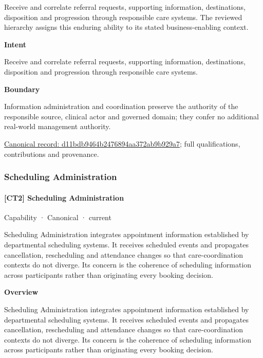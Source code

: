 Receive and correlate referral requests, supporting information, destinations, disposition and progression through responsible care systems. The reviewed hierarchy assigns this enduring ability to its stated business-enabling context.



\textbf{Intent}



Receive and correlate referral requests, supporting information, destinations, disposition and progression through responsible care systems.



\textbf{Boundary}



Information administration and coordination preserve the authority of the responsible source, clinical actor and governed domain; they confer no additional real-world management authority.


{\footnotesize \href{../../../../continuum/strategy/capability/d11bdb9464b2476894aa372ab9b929a7.md}{Canonical record: d11bdb9464b2476894aa372ab9b929a7}; full qualifications, contributions and provenance.}\par
\subsubsection{Scheduling Administration}

\paragraph{[CT2] Scheduling Administration}

\label{element:35fb3744c900470f9895056246a13fb1}
{\small Capability · Canonical · current}\par

Scheduling Administration integrates appointment information established by departmental scheduling systems. It receives scheduled events and propagates cancellation, rescheduling and attendance changes so that care-coordination contexts do not diverge. Its concern is the coherence of scheduling information across participants rather than originating every booking decision.



\textbf{Overview}



Scheduling Administration integrates appointment information established by departmental scheduling systems. It receives scheduled events and propagates cancellation, rescheduling and attendance changes so that care-coordination contexts do not diverge. Its concern is the coherence of scheduling information across participants rather than originating every booking decision.



